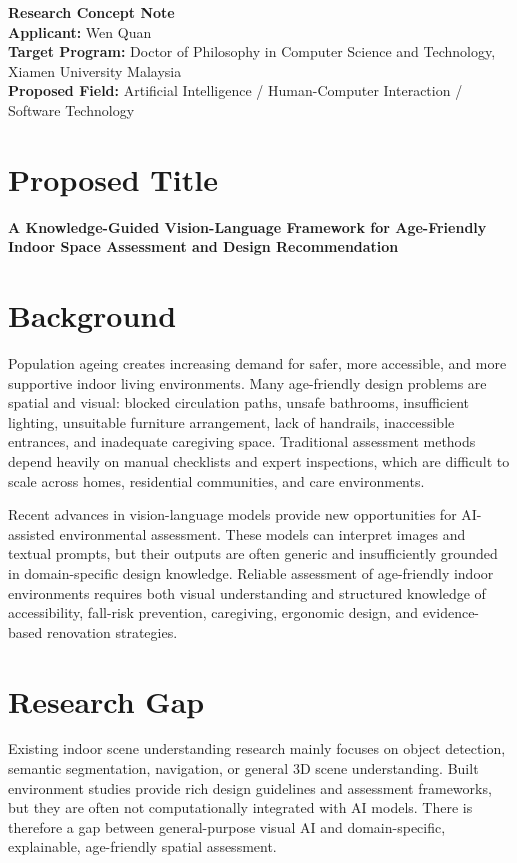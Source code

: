 \documentclass[11pt,a4paper]{article}
\begin{document}
{\LARGE \textbf{Research Concept Note}}\\
\textbf{Applicant:} Wen Quan\\
\textbf{Target Program:} Doctor of Philosophy in Computer Science and Technology, Xiamen University Malaysia\\
\textbf{Proposed Field:} Artificial Intelligence / Human-Computer Interaction / Software Technology

\section*{Proposed Title}
\textbf{A Knowledge-Guided Vision-Language Framework for Age-Friendly Indoor Space Assessment and Design Recommendation}

\section*{Background}
Population ageing creates increasing demand for safer, more accessible, and more supportive indoor living environments. Many age-friendly design problems are spatial and visual: blocked circulation paths, unsafe bathrooms, insufficient lighting, unsuitable furniture arrangement, lack of handrails, inaccessible entrances, and inadequate caregiving space. Traditional assessment methods depend heavily on manual checklists and expert inspections, which are difficult to scale across homes, residential communities, and care environments.

Recent advances in vision-language models provide new opportunities for AI-assisted environmental assessment. These models can interpret images and textual prompts, but their outputs are often generic and insufficiently grounded in domain-specific design knowledge. Reliable assessment of age-friendly indoor environments requires both visual understanding and structured knowledge of accessibility, fall-risk prevention, caregiving, ergonomic design, and evidence-based renovation strategies.

\section*{Research Gap}
Existing indoor scene understanding research mainly focuses on object detection, semantic segmentation, navigation, or general 3D scene understanding. Built environment studies provide rich design guidelines and assessment frameworks, but they are often not computationally integrated with AI models. There is therefore a gap between general-purpose visual AI and domain-specific, explainable, age-friendly spatial assessment.
\end{document}
